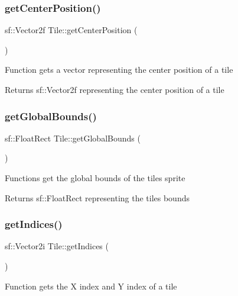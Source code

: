 \subsubsection{\texorpdfstring{getCenterPosition()}{getCenterPosition()}}
{\footnotesize\ttfamily sf\+::\+Vector2f Tile\+::get\+Center\+Position (\begin{DoxyParamCaption}{ }\end{DoxyParamCaption})}



Function gets a vector representing the center position of a tile 

\begin{DoxyReturn}{Returns}
sf\+::\+Vector2f representing the center position of a tile
\end{DoxyReturn}
\mbox{\label{class_tile_a7bd5a68ec8be3d8bd46ad109bfc7fb08}} 
\subsubsection{\texorpdfstring{getGlobalBounds()}{getGlobalBounds()}}
{\footnotesize\ttfamily sf\+::\+Float\+Rect Tile\+::get\+Global\+Bounds (\begin{DoxyParamCaption}{ }\end{DoxyParamCaption})}



Functions get the global bounds of the tile\textquotesingle{}s sprite 

\begin{DoxyReturn}{Returns}
sf\+::\+Float\+Rect representing the tile\textquotesingle{}s bounds
\end{DoxyReturn}
\mbox{\label{class_tile_a34aba68a8504064fbed9fb9eeec98c6b}} 
\subsubsection{\texorpdfstring{getIndices()}{getIndices()}}
{\footnotesize\ttfamily sf\+::\+Vector2i Tile\+::get\+Indices (\begin{DoxyParamCaption}{ }\end{DoxyParamCaption})}



Function gets the X index and Y index of a tile 


